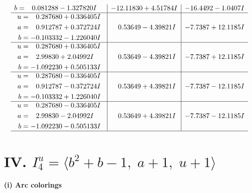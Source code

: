 \documentclass[1p]{elsarticle_modified}
\theoremstyle{definition}
\begin{document}
$$\begin{array}{c|c|c}
\begin{aligned}
b &= \phantom{-}0.081288 - 1.327820 I\end{aligned}
 & -12.11830 + 4.51784 I & -16.4492 - 1.0407 I \\ \hline\begin{aligned}
u &= \phantom{-}0.287680 + 0.336405 I \\
a &= \phantom{-}0.912787 + 0.372724 I \\
b &= -0.103332 - 1.226040 I\end{aligned}
 & \phantom{-}0.53649 - 4.39821 I & -7.7387 + 12.1185 I \\ \hline\begin{aligned}
u &= \phantom{-}0.287680 + 0.336405 I \\
a &= \phantom{-}2.99830 + 2.04992 I \\
b &= -1.092230 + 0.505133 I\end{aligned}
 & \phantom{-}0.53649 - 4.39821 I & -7.7387 + 12.1185 I \\ \hline\begin{aligned}
u &= \phantom{-}0.287680 - 0.336405 I \\
a &= \phantom{-}0.912787 - 0.372724 I \\
b &= -0.103332 + 1.226040 I\end{aligned}
 & \phantom{-}0.53649 + 4.39821 I & -7.7387 - 12.1185 I \\ \hline\begin{aligned}
u &= \phantom{-}0.287680 - 0.336405 I \\
a &= \phantom{-}2.99830 - 2.04992 I \\
b &= -1.092230 - 0.505133 I\end{aligned}
 & \phantom{-}0.53649 + 4.39821 I & -7.7387 - 12.1185 I\\
 \hline 
 \end{array}$$\newpage\newpage\renewcommand{\arraystretch}{1}
\centering \section*{IV. $I^u_{4}= \langle b^2+b-1,\;a+1,\;u+1 \rangle$}
\flushleft \textbf{(i) Arc colorings}\\
\end{document}
